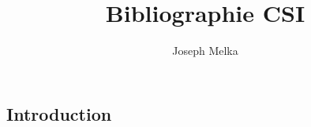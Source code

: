 \documentclass[twocolumn]{article}
\title{Bibliographie CSI}
\author{Joseph Melka}
\begin{document}
\maketitle
\begin{refsection}
\section{Introduction}

\printbibliography[]
\end{refsection}

\clearpage


\begin{refsection}

\printbibliography[]
\end{refsection}

\clearpage

\begin{refsection}

\printbibliography[]
\end{refsection}

\clearpage

\begin{refsection}

\printbibliography[]
\end{refsection}

\clearpage
\begin{refsection}

\printbibliography[]
\end{refsection}

\clearpage
\end{document}
